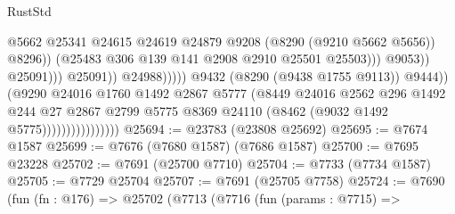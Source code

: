 \begin{lexlean}{RustStd}
\begin{coremodule}
                                                                @5662
                                                                @25341
                                                                @24615
                                                                @24619
                                                                @24879
                                                                @9208
                                                                (@8290 (@9210 @5662 @5656))
                                                                @8296))
                                                            (@25483
                                                              @306
                                                              @139
                                                              @141
                                                              @2908
                                                              @2910
                                                              @25501
                                                              @25503)))
                                                        @9053))
                                                    @25091)))
                                              @25091))
                                          @24988)))))
                                @9432
                                (@8290 (@9438 @1755 @9113))
                                @9444))
                            (@9290
                              @24016
                              @1760
                              @1492
                              @2867
                              @5777
                              (@8449
                                @24016
                                @2562
                                @296
                                @1492
                                @244
                                @27
                                @2867
                                @2799
                                @5775
                                @8369
                                @24110
                                (@8462 (@9032 @1492 @5775))))))))))))))))
@25694 := @23783 (@23808 @25692)
@25695 := @7674 @1587
@25699 := @7676 (@7680 @1587) (@7686 @1587)
@25700 := @7695 @23228
@25702 := @7691 (@25700 @7710)
@25704 := @7733 (@7734 @1587)
@25705 := @7729 @25704
@25707 := @7691 (@25705 @7758)
@25724 := @7690
    (fun (fn : @176) =>
    @25702
      (@7713
        (@7716
          (fun (params : @7715) =>

\end{coremodule}
\end{lexlean}
